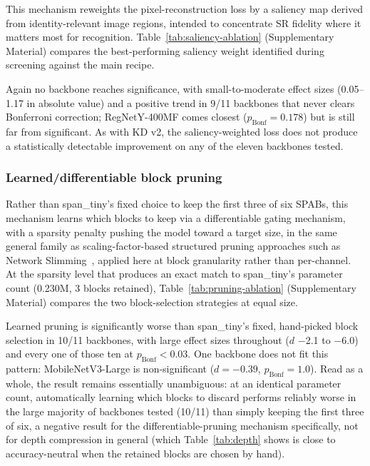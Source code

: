 \documentclass[11pt]{article}
\begin{document}
This mechanism reweights the pixel-reconstruction loss by a saliency map derived from identity-relevant image regions, intended to concentrate SR fidelity where it matters most for recognition. Table~\ref{tab:saliency-ablation} (Supplementary Material) compares the best-performing saliency weight identified during screening against the main recipe.

Again no backbone reaches significance, with small-to-moderate effect sizes (0.05--1.17 in absolute value) and a positive trend in 9/11 backbones that never clears Bonferroni correction; RegNetY-400MF comes closest ($p_{\text{Bonf}}{=}0.178$) but is still far from significant. As with KD v2, the saliency-weighted loss does not produce a statistically detectable improvement on any of the eleven backbones tested.

\subsubsection{Learned/differentiable block pruning}

Rather than span\_tiny's fixed choice to keep the first three of six SPABs, this mechanism learns which blocks to keep via a differentiable gating mechanism, with a sparsity penalty pushing the model toward a target size, in the same general family as scaling-factor-based structured pruning approaches such as Network Slimming~\cite{liu2017slimming}, applied here at block granularity rather than per-channel. At the sparsity level that produces an exact match to span\_tiny's parameter count (0.230M, 3 blocks retained), Table~\ref{tab:pruning-ablation} (Supplementary Material) compares the two block-selection strategies at equal size.

Learned pruning is significantly worse than span\_tiny's fixed, hand-picked block selection in 10/11 backbones, with large effect sizes throughout ($d$ $-$2.1 to $-$6.0) and every one of those ten at $p_{\text{Bonf}} < 0.03$. One backbone does not fit this pattern: MobileNetV3-Large is non-significant ($d{=}{-}0.39$, $p_{\text{Bonf}}{=}1.0$). Read as a whole, the result remains essentially unambiguous: at an identical parameter count, automatically learning which blocks to discard performs reliably worse in the large majority of backbones tested (10/11) than simply keeping the first three of six, a negative result for the differentiable-pruning mechanism specifically, not for depth compression in general (which Table~\ref{tab:depth} shows is close to accuracy-neutral when the retained blocks are chosen by hand).
\end{document}
